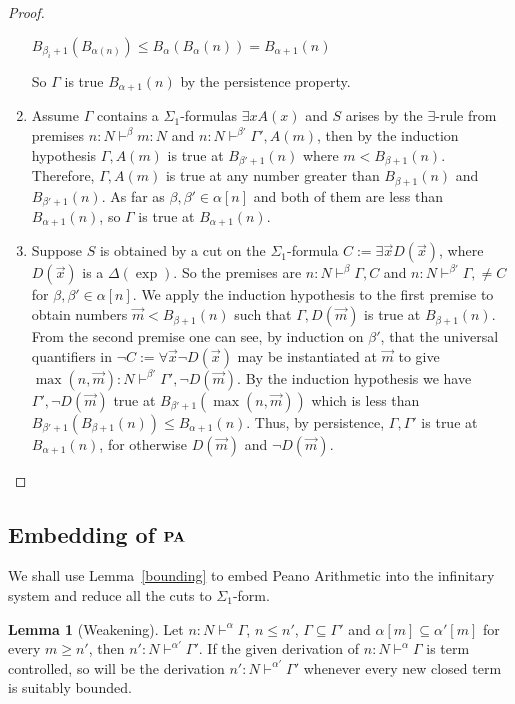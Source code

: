 \documentclass[8pt]{article}
\theoremstyle{definition}
\theoremstyle{definition}
\theoremstyle{definition}
\theoremstyle{definition}
\theoremstyle{definition}
\theoremstyle{definition}
\theoremstyle{definition}
\theoremstyle{definition}
\newtheorem{lemma}{Lemma}[section]
\theoremstyle{definition}
\theoremstyle{definition}
\theoremstyle{definition}
\theoremstyle{definition}
\theoremstyle{definition}
\theoremstyle{question}
\begin{document}
\begin{proof}
\begin{enumerate}
\begin{center}
    $B_{\beta_i + 1}(B_{\alpha(n)}) \leq B_{\alpha}(B_{\alpha}(n)) = B_{\alpha + 1}(n)$
    \end{center}
    So $\Gamma$ is true $B_{\alpha + 1}(n)$ by the persistence property.
    \item Assume $\Gamma$ contains a $\Sigma_1$-formulas $\exists x A(x)$ and $S$ arises by the $\exists$-rule
    from premises $n : N \vdash^{\beta} m : N$ and $n : N \vdash^{\beta'} \Gamma', A(m)$, then
    by the induction hypothesis $\Gamma, A(m)$ is true at $B_{\beta' + 1}(n)$ where $m < B_{\beta + 1}(n)$.
    Therefore, $\Gamma, A(m)$ is true at any number greater than $B_{\beta + 1}(n)$ and $B_{\beta' + 1}(n)$.
    As far as $\beta, \beta' \in \alpha[n]$ and both of them are less than $B_{\alpha + 1}(n)$, so $\Gamma$ is true at $B_{\alpha + 1}(n)$.
    \item Suppose $S$ is obtained by a cut on the $\Sigma_1$-formula $C := \exists \vec{x} D(\vec{x})$, where $D(\vec{x})$ 
    is a $\Delta(\operatorname{exp})$. So the premises are $n : N \vdash^{\beta} \Gamma, C$ and $n : N \vdash^{\beta'} \Gamma, \neq C$
    for $\beta, \beta' \in \alpha[n]$. We apply the induction hypothesis to the first premise to obtain numbers
    $\vec{m} < B_{\beta + 1}(n)$ such that $\Gamma, D(\vec{m})$ is true at $B_{\beta + 1}(n)$.
    From the second premise one can see, by induction on $\beta'$, that the universal quantifiers in 
    $\neg C := \forall \vec{x} \neg D(\vec{x})$ may be instantiated at $\vec{m}$ to give 
    $\max(n, \vec{m}) : N \vdash^{\beta'} \Gamma', \neg D(\vec{m})$. By the induction hypothesis we have $\Gamma', \neg D(\vec{m})$
    true at $B_{\beta' + 1}(\max(n, \vec{m}))$ which is less than $B_{\beta' + 1}(B_{\beta + 1}(n)) \leq B_{\alpha + 1}(n)$.
    Thus, by persistence, $\Gamma, \Gamma'$ is true at $B_{\alpha + 1}(n)$, for otherwise $D(\vec{m})$ and $\neg D(\vec{m})$.
  \end{enumerate}
\end{proof}

\subsection{Embedding of ${\bf PA}$}

We shall use Lemma~\ref{bounding} to embed Peano Arithmetic into the infinitary system and reduce
all the cuts to $\Sigma_1$-form.

\begin{lemma}[Weakening]
  Let $n : N \vdash^{\alpha} \Gamma$, $n \leq n'$, $\Gamma \subseteq \Gamma'$ and $\alpha[m] \subseteq \alpha'[m]$
  for every $m \geq n'$, then $n' : N \vdash^{\alpha'} \Gamma'$.
  If the given derivation of $n : N \vdash^{\alpha} \Gamma$ is term controlled, so will be the derivation $n' : N \vdash^{\alpha'} \Gamma'$
  whenever every new closed term is suitably bounded.
\end{lemma}
\end{document}
